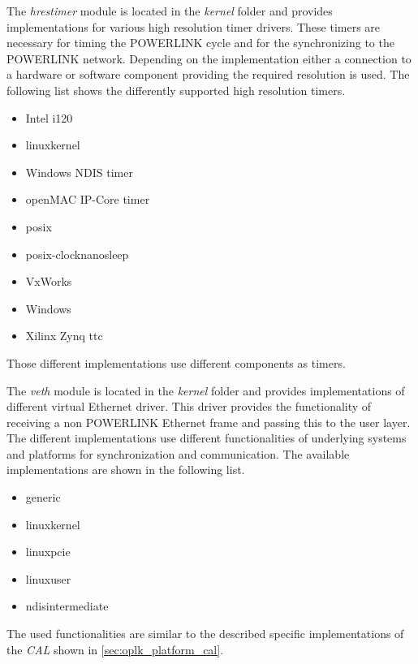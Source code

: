 \begin{description}[leftmargin=1cm]
    \item[hrestimer] The \emph{hrestimer} module is located in the \emph{kernel} folder and provides implementations for various high resolution timer drivers.
    These timers are necessary for timing the POWERLINK cycle and for the synchronizing to the POWERLINK network.
    Depending on the implementation either a connection to a hardware or software component providing the required resolution is used.
    The following list shows the differently supported high resolution timers.
    \begin{multicols}{3}
        \begin{itemize}
            \item Intel i120
            \item linuxkernel
            \item Windows NDIS timer
            \item openMAC IP-Core timer
            \item posix
            \item posix-clocknanosleep
            \item VxWorks
            \item Windows
            \item Xilinx Zynq ttc
        \end{itemize}
    \end{multicols}
    Those different implementations use different components as timers.
    
    \item[veth] The \emph{veth} module is located in the \emph{kernel} folder and provides implementations of different virtual Ethernet driver.
    This driver provides the functionality of receiving a non POWERLINK Ethernet frame and passing this to the user layer.
    The different implementations use different functionalities of underlying systems and platforms for synchronization and communication.
    The available implementations are shown in the following list.
    \begin{multicols}{3}
        \begin{itemize}
            \item generic
            \item linuxkernel
            \item linuxpcie
            \item linuxuser
            \item ndisintermediate
        \end{itemize}
    \end{multicols}
    The used functionalities are similar to the described specific implementations of the \emph{CAL} shown in \ref{sec:oplk_platform_cal}.\\
    

\end{description}
